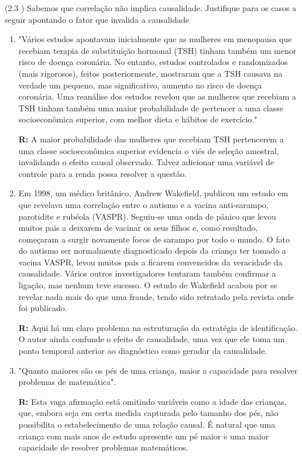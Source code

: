 \documentclass[12pt,letterpaper, onecolumn]{exam}
\renewenvironment{solution}
  {\par\noindent\textbf{R:}\enspace\color{blue}}
  {\par\color{black}}
\begin{document}
\begin{questions}
    \question (2.3 \citep{pereda_denisard}) Sabemos que correlação não implica causalidade. Justifique para os casos a seguir apontando o fator que invalida a causalidade
    \begin{enumerate} [label = (\alph*)]
        \item "Vários estudos apontavam inicialmente que as mulheres em menopausa que recebiam terapia de substituição hormonal (TSH) tinham também um menor risco de doença coronária. No entanto, estudos controlados e randomizados (mais rigorosos), feitos posteriormente, mostraram que a TSH causava na verdade um pequeno, mas significativo, aumento no risco de doença coronária. Uma reanálise dos estudos revelou que as mulheres que recebiam a TSH tinham também uma maior probabilidade de pertencer a uma classe socioeconômica superior, com melhor dieta e hábitos de exercício."
        \begin{solution}
            A maior probabilidade das mulheres que recebiam TSH pertencerem a uma classe socioeconômica superior evidencia o viés de seleção amostral, invalidando o efeito causal observado. Talvez adicionar uma variável de controle para a renda possa resolver a questão. 
        \end{solution}
        \item Em 1998, um médico britânico, Andrew Wakefield, publicou um estudo em que revelava uma correlação entre o autismo e a vacina anti-sarampo, parotidite e rubéola (VASPR). Seguiu-se uma onda de pânico que levou muitos pais a deixarem de vacinar os seus filhos e, como resultado, começaram a surgir novamente focos de sarampo por todo o mundo. O fato do autismo ser normalmente diagnosticado depois da criança ter tomado a vacina VASPR, levou muitos pais a ficarem convencidos da veracidade da causalidade. Vários outros investigadores tentaram também confirmar a ligação, mas nenhum teve sucesso. O estudo de Wakefield acabou por se revelar nada mais do que uma fraude, tendo sido retratado pela revista onde foi publicado.
        \begin{solution}
            Aqui há um claro problema na estruturação da estratégia de identificação. O autor ainda confunde o efeito de causalidade, uma vez que ele toma um ponto temporal anterior ao diagnóstico como gerador da causalidade.
        \end{solution}
        \item "Quanto maiores são os pés de uma criança, maior a capacidade para resolver problemas de matemática".
        \begin{solution}
            Esta vaga afirmação está omitindo variáveis como a idade das crianças, que, embora seja em certa medida capturada pelo tamanho dos pés, não possibilita o estabelecimento de uma relação causal. É natural que uma criança com mais anos de estudo apresente um pé maior e uma maior capacidade de resolver problemas matemáticos.
        \end{solution}
    \end{enumerate}


\end{questions}
\end{document}
